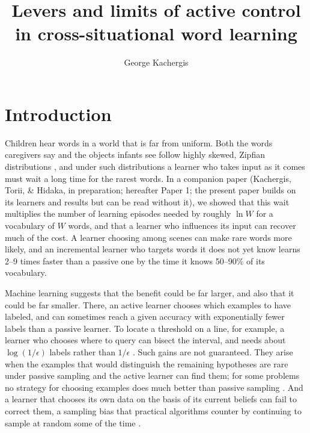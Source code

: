 \documentclass[a4paper,natbib,man]{apa6}
\title{Levers and limits of active control in cross-situational word learning}
\author{George Kachergis}
\affiliation{Department of Psychology, Stanford University, Stanford, CA, 94305, USA}
\begin{document}
\maketitle

\section{Introduction}

Children hear words in a world that is far from uniform. Both the words caregivers say and the objects infants see follow highly skewed, Zipfian distributions \citep{LaviRotbain:2023,Clerkin:2017}, and under such distributions a learner who takes input as it comes must wait a long time for the rarest words. In a companion paper (Kachergis, Torii, \& Hidaka, in preparation; hereafter Paper 1; the present paper builds on its learners and results but can be read without it), we showed that this wait multiplies the number of learning episodes needed by roughly $\ln W$ for a vocabulary of $W$ words, and that a learner who influences its input can recover much of the cost. A learner choosing among scenes can make rare words more likely, and an incremental learner who targets words it does not yet know learns 2--9 times faster than a passive one by the time it knows 50--90\% of its vocabulary.

Machine learning suggests that the benefit could be far larger, and also that it could be far smaller. There, an active learner chooses which examples to have labeled, and can sometimes reach a given accuracy with exponentially fewer labels than a passive learner. To locate a threshold on a line, for example, a learner who chooses where to query can bisect the interval, and needs about $\log(1/\epsilon)$ labels rather than $1/\epsilon$ \citep{Settles:2012,Dasgupta:2011}. Such gains are not guaranteed. They arise when the examples that would distinguish the remaining hypotheses are rare under passive sampling and the active learner can find them; for some problems no strategy for choosing examples does much better than passive sampling \citep{Dasgupta:2005,Hanneke:2007}. And a learner that chooses its own data on the basis of its current beliefs can fail to correct them, a sampling bias that practical algorithms counter by continuing to sample at random some of the time \citep{Dasgupta:2008,Beygelzimer:2009}.
\end{document}
